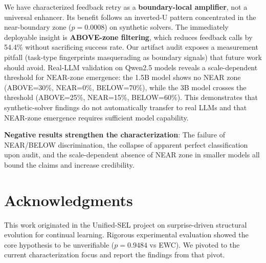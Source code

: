 \documentclass[11pt,a4paper]{article}
\begin{document}
We have characterized feedback retry as a \textbf{boundary-local amplifier}, not a universal enhancer. Its benefit follows an inverted-U pattern concentrated in the near-boundary zone ($p = 0.0008$) on synthetic solvers. The immediately deployable insight is \textbf{ABOVE-zone filtering}, which reduces feedback calls by 54.4\% without sacrificing success rate. Our artifact audit exposes a measurement pitfall (task-type fingerprints masquerading as boundary signals) that future work should avoid. Real-LLM validation on Qwen2.5 models reveals a scale-dependent threshold for NEAR-zone emergence: the 1.5B model shows no NEAR zone (ABOVE=30\%, NEAR=0\%, BELOW=70\%), while the 3B model crosses the threshold (ABOVE=25\%, NEAR=15\%, BELOW=60\%). This demonstrates that synthetic-solver findings do not automatically transfer to real LLMs and that NEAR-zone emergence requires sufficient model capability.

\textbf{Negative results strengthen the characterization}: The failure of NEAR/BELOW discrimination, the collapse of apparent perfect classification upon audit, and the scale-dependent absence of NEAR zone in smaller models all bound the claims and increase credibility.

\section*{Acknowledgments}

This work originated in the Unified-SEL project on surprise-driven structural evolution for continual learning. Rigorous experimental evaluation showed the core hypothesis to be unverifiable ($p = 0.9484$ vs EWC). We pivoted to the current characterization focus and report the findings from that pivot.
\end{document}
